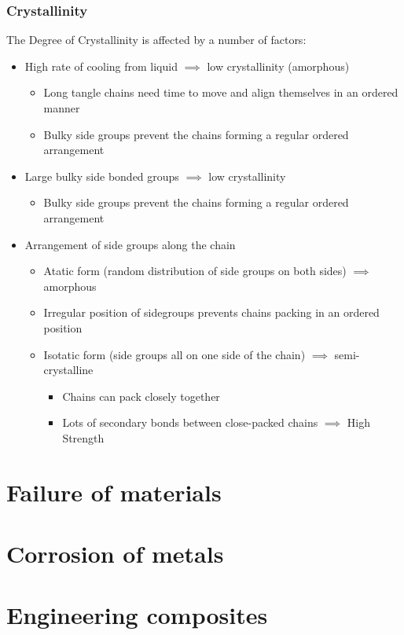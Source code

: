 \documentclass[12pt]{article}
\begin{document}
\subsubsection{Crystallinity}
The Degree of Crystallinity is affected by a number of factors:
\begin{itemize}
  \item High rate of cooling from liquid $\implies$ low crystallinity (amorphous)
    \begin{itemize}
      \item Long tangle chains need time to move and align themselves in an ordered manner
      \item Bulky side groups prevent the chains forming a regular ordered arrangement 
    \end{itemize}
  \item Large bulky side bonded groups $\implies$ low crystallinity 
    \begin{itemize}
      \item Bulky side groups prevent the chains forming a regular ordered arrangement
    \end{itemize}
  \item Arrangement of side groups along the chain 
    \begin{itemize}
      \item Atatic form (random distribution of side groups on both sides) $\implies$ amorphous
      \item \begin{itemize}
          Irregular position of sidegroups prevents chains packing in an ordered position
        \end{itemize}
      \item Isotatic form (side groups all on one side of the chain) $\implies$ semi-crystalline         \begin{itemize}
          \item Chains can pack closely together 
          \item Lots of secondary bonds between close-packed chains $\implies$ High Strength
        \end{itemize}
    \end{itemize}
\end{itemize}

\section{Failure of materials}
\section{Corrosion of metals}
\section{Engineering composites}
\end{document}
